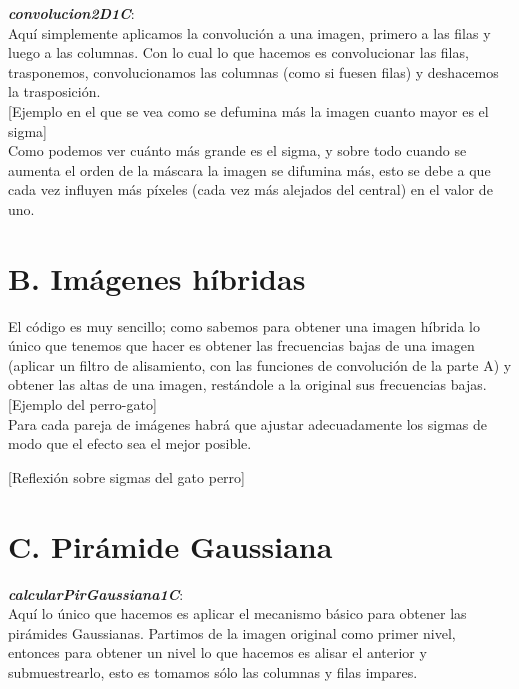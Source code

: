 \documentclass[10pt,a4paper]{article}
\begin{document}
\textbf{\textit{convolucion2D1C}}:\\

Aquí simplemente aplicamos la convolución a una imagen, primero a las filas y luego a las columnas. Con lo cual lo que hacemos es convolucionar las filas, trasponemos, convolucionamos las columnas (como si fuesen filas) y deshacemos la trasposición.\\

[Ejemplo en el que se vea como se defumina más la imagen cuanto mayor es el sigma]\\

Como podemos ver cuánto más grande es el sigma, y sobre todo cuando se aumenta el orden de la máscara la imagen se difumina más, esto se debe a que cada vez influyen más píxeles (cada vez más alejados del central) en el valor de uno.\\

\section*{B. Imágenes híbridas}

El código es muy sencillo; como sabemos para obtener una imagen híbrida lo único que tenemos que hacer es obtener las frecuencias bajas de una imagen (aplicar un filtro de alisamiento, con las funciones de convolución de la parte A) y obtener las altas de una imagen, restándole a la original sus frecuencias bajas.\\

[Ejemplo del perro-gato]\\

Para cada pareja de imágenes habrá que ajustar adecuadamente los sigmas de modo que el efecto sea el mejor posible.

[Reflexión sobre sigmas del gato perro]\\

\section*{C. Pirámide Gaussiana}

\textbf{\textit{calcularPirGaussiana1C}}:\\

Aquí lo único que hacemos es aplicar el mecanismo básico para obtener las pirámides Gaussianas. Partimos de la imagen original como primer nivel, entonces para obtener un nivel lo que hacemos es alisar el anterior y submuestrearlo, esto es tomamos sólo las columnas y filas impares.\\
\end{document}
